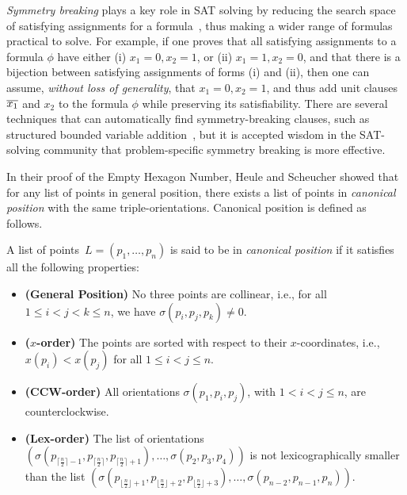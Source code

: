 \emph{Symmetry breaking} plays a key role in SAT solving by reducing the search space of satisfying assignments for a formula~\cite{biereHandbookSatisfiabilityVolume2009,Crawford},
thus making a wider range of formulas practical to solve.
For example, if one proves that all satisfying assignments to a formula $\phi$ have either (i) $x_1 = 0, x_2 = 1$, or  (ii) $x_1 = 1, x_2 = 0$, and that there is a bijection between satisfying assignments of forms (i) and (ii),
then one can assume, \emph{without loss of generality}, that $x_1 = 0, x_2 = 1$, and thus add unit clauses $\overline{x_1}$ and $x_2$ to the formula $\phi$ while preserving its satisfiability.
There are several techniques that can automatically find symmetry-breaking clauses,
such as structured bounded variable addition~\cite{sbva},
but it is accepted wisdom in the SAT-solving community that problem-specific symmetry breaking is more effective.

In their proof of the Empty Hexagon Number,
Heule and Scheucher showed that for any list of points in general position,
there exists a list of points in \emph{canonical position} with the same triple-orientations.
Canonical position is defined as follows.
\begin{definition}
A list of points~$L = (p_1,\ldots, p_{n})$ is said to be in \emph{canonical position} if it satisfies all the following properties:
\begin{itemize}
    \item \textbf{(General Position)} No three points are collinear, i.e., for all $1 \leq i < j < k \leq n$, we have $\sigma(p_i, p_j, p_k) \neq 0$.
    \item \textbf{($x$-order)} The points are sorted with respect to their $x$-coordinates, i.e., $x(p_i) < x(p_j)$ for all $1 \leq i < j \leq n$.
    \item \textbf{(CCW-order)} All orientations $\sigma(p_1, p_i, p_j)$, with $1 < i < j \leq n$, are counterclockwise.
    \item \textbf{(Lex-order)} The list of orientations \( \left(\sigma\left(p_{\lceil \frac{n}{2} \rceil -1}, p_{\lceil \frac{n}{2} \rceil},p_{\lceil \frac{n}{2} \rceil+1}\right), \ldots, \sigma\left(p_2, p_3, p_4\right) \right)\) is not lexicographically smaller than the list \(\left(\sigma\left(p_{\lfloor \frac{n}{2} \rfloor  + 1}, p_{\lfloor \frac{n}{2} \rfloor+2},p_{\lfloor \frac{n}{2} \rfloor+3}\right), \ldots, \sigma\left(p_{n-2}, p_{n-1}, p_{n}\right) \right).\)
\end{itemize}
\end{definition}

